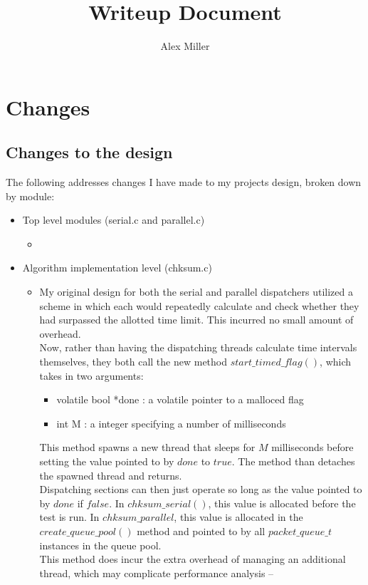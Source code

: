\documentclass[]{article}
\title{Writeup Document}
\author{Alex Miller}
\begin{document}
\maketitle

\section{Changes}
\subsection{Changes to the design}
The following addresses changes I have made to my projects design, broken down by module:
\begin{itemize}
	\item Top level modules (serial.c and parallel.c)
	\begin{itemize}
		\item 
	\end{itemize}
	\item Algorithm implementation level (chksum.c)
	\begin{itemize}
		\item My original design for both the serial and parallel dispatchers utilized a scheme in which each would repeatedly calculate and check whether they had surpassed the allotted time limit. This incurred no small amount of overhead. 
		\\
		Now, rather than having the dispatching threads calculate time intervals themselves, they both call the new method $start\_timed\_flag()$, which takes in two arguments:
		\begin{itemize}
			\item volatile bool *done : a volatile pointer to a malloced flag
			\item int M : a integer specifying a number of milliseconds
		\end{itemize}
		This method spawns a new thread that sleeps for $M$ milliseconds before setting the value pointed to by $done$ to $true$. The method than detaches the spawned thread and returns.
		\\
		Dispatching sections can then just operate so long as the value pointed to by $done$ if $false$. In $chksum\_serial()$, this value is allocated before the test is run. In $chksum\_parallel$, this value is allocated in the $create\_queue\_pool()$ method and pointed to by all $packet\_queue\_t$ instances in the queue pool.
		\\
		This method does incur the extra overhead of managing an additional thread, which may complicate performance analysis -- %

\end{itemize}
\end{itemize}
\end{document}
